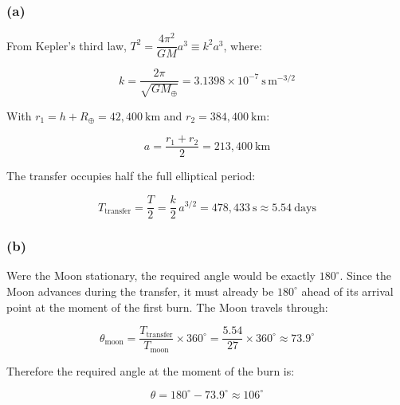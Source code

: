 \documentclass[10pt, a4paper]{article}
\begin{document}
\begin{tcolorbox}[colback=blue!5!white, colframe=blue!75!black,
                  title={Theory: Solution}]

\subsubsection*{(a)}

From Kepler's third law, $T^2 = \dfrac{4\pi^2}{GM}a^3 \equiv k^2 a^3$,
where:

\begin{equation*}
    k = \frac{2\pi}{\sqrt{GM_\oplus}}
      = 3.1398\times10^{-7}~\mathrm{s\,m^{-3/2}}
\end{equation*}

With $r_1 = h + R_\oplus = 42{,}400~\mathrm{km}$ and
$r_2 = 384{,}400~\mathrm{km}$:

\begin{equation}
    a = \frac{r_1 + r_2}{2} = 213{,}400~\mathrm{km}
\end{equation}

The transfer occupies half the full elliptical period:

\begin{equation*}
    T_\mathrm{transfer} = \frac{T}{2} = \frac{k}{2}\,a^{3/2}
    = 478{,}433~\mathrm{s} \approx 5.54~\mathrm{days}
\end{equation*}

\subsubsection*{(b)}

Were the Moon stationary, the required angle would be exactly
$180^\circ$. Since the Moon advances during the transfer, it must already
be $180^\circ$ ahead of its arrival point at the moment of the first burn.
The Moon travels through:

\begin{equation*}
    \theta_\mathrm{moon}
    = \frac{T_\mathrm{transfer}}{T_\mathrm{moon}}\times 360^\circ
    = \frac{5.54}{27}\times 360^\circ
    \approx 73.9^\circ
\end{equation*}

Therefore the required angle at the moment of the burn is:

\begin{equation*}
    \theta = 180^\circ - 73.9^\circ \approx 106^\circ
\end{equation*}



\end{tcolorbox}
\end{document}
